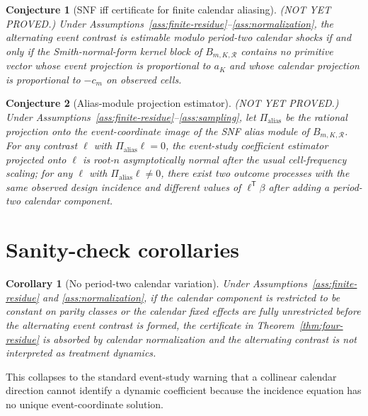 \documentclass[11pt]{article}
\newcommand{\transpose}{\mathsf{T}}
\newcommand{\calR}{\mathcal{R}}
\theoremstyle{definition}
\theoremstyle{plain}
\newtheorem{conjecture}{Conjecture}
\newtheorem{corollary}{Corollary}
\theoremstyle{remark}
\begin{document}
\begin{conjecture}[SNF iff certificate for finite calendar aliasing]\label{conj:snf-iff}
(NOT YET PROVED.) Under Assumptions~\ref{ass:finite-residue}--\ref{ass:normalization}, the alternating event contrast is estimable modulo period-two calendar shocks if and only if the Smith-normal-form kernel block of $B_{m,K,\calR}$ contains no primitive vector whose event projection is proportional to $a_K$ and whose calendar projection is proportional to $-c_m$ on observed cells.
\end{conjecture}

\begin{conjecture}[Alias-module projection estimator]\label{conj:estimator}
(NOT YET PROVED.) Under Assumptions~\ref{ass:finite-residue}--\ref{ass:sampling}, let $\Pi_{\mathrm{alias}}$ be the rational projection onto the event-coordinate image of the SNF alias module of $B_{m,K,\calR}$. For any contrast $\ell$ with $\Pi_{\mathrm{alias}}\ell=0$, the event-study coefficient estimator projected onto $\ell$ is root-$n$ asymptotically normal after the usual cell-frequency scaling; for any $\ell$ with $\Pi_{\mathrm{alias}}\ell\neq 0$, there exist two outcome processes with the same observed design incidence and different values of $\ell^\transpose\beta$ after adding a period-two calendar component.
\end{conjecture}

\section{Sanity-check corollaries}
\begin{corollary}[No period-two calendar variation]\label{cor:no-calendar}
Under Assumptions~\ref{ass:finite-residue} and \ref{ass:normalization}, if the calendar component is restricted to be constant on parity classes or the calendar fixed effects are fully unrestricted before the alternating event contrast is formed, the certificate in Theorem~\ref{thm:four-residue} is absorbed by calendar normalization and the alternating contrast is not interpreted as treatment dynamics.
\end{corollary}
This collapses to the standard event-study warning that a collinear calendar direction cannot identify a dynamic coefficient because the incidence equation has no unique event-coordinate solution.
\end{document}
